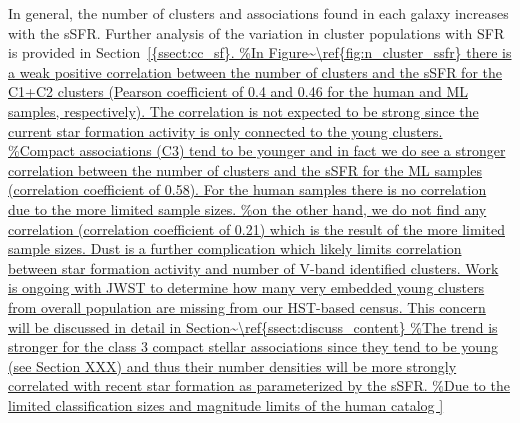 \documentclass[linenumbers]{aastex63}
\begin{document}
In general, the number of clusters and associations found in each galaxy increases with the sSFR.  Further analysis of the variation in cluster populations with SFR is provided in Section~\ref{{ssect:cc_sf}.







}
\end{document}
